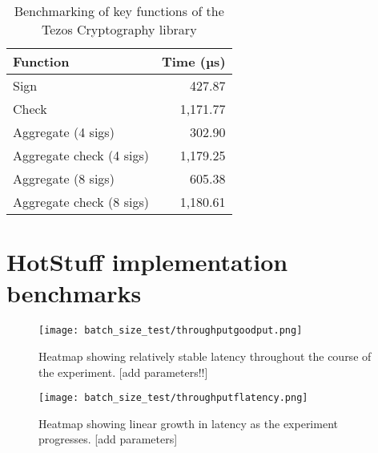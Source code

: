 \begin{table}[!h]
	\centering
	\begin{tabular}{|l|r|}
	\hline
	Function                 & Time (µs) \\ \hline
	Sign                     & 427.87   \\
	Check                    & 1,171.77 \\
	Aggregate (4 sigs)       & 302.90   \\
	Aggregate check (4 sigs) & 1,179.25 \\
	Aggregate (8 sigs)       & 605.38   \\
	Aggregate check (8 sigs) & 1,180.61 \\ \hline
	\end{tabular}
	\caption{Benchmarking of key functions of the Tezos Cryptography library}
\end{table}

\section{HotStuff implementation benchmarks} \label{hotstuffbenchmarks}

\begin{figure}[h!]
\centering
\texttt{[image: batch\_size\_test/throughputgoodput.png]}
\caption{Heatmap showing relatively stable latency throughout the course of the experiment. [add parameters!!]}
\label{stableheatmap}
\end{figure}

\begin{figure}[h!]
\centering
\texttt{[image: batch\_size\_test/throughputflatency.png]}
\caption{Heatmap showing linear growth in latency as the experiment progresses. [add parameters]}
\label{linearheatmap}
\end{figure}

